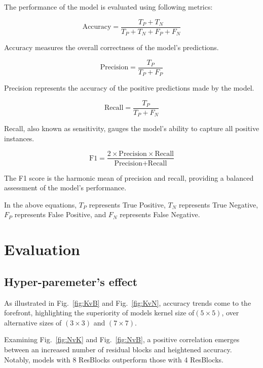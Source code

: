 The performance of the model is evaluated using following metrics:

\begin{equation}
	\text{Accuracy} = \frac{T_P + T_N}{T_P + T_N + F_P + F_N}
\end{equation}

Accuracy measures the overall correctness of the model's predictions.

\begin{equation}
	\text{Precision} = \frac{T_P}{T_P + F_P}
\end{equation}

Precision represents the accuracy of the positive predictions made by the model.

\begin{equation}
	\text{Recall} = \frac{T_P}{T_P + F_N}
\end{equation}

Recall, also known as sensitivity, gauges the model's ability to capture all positive instances.

\begin{equation}
	\text{F1} = \frac{2 \times \text{Precision} \times \text{Recall}}{\text{Precision} + \text{Recall}}
\end{equation}

The F1 score is the harmonic mean of precision and recall, providing a balanced assessment of the model's performance.

In the above equations, $T_P$ represents True Positive, $T_N$ represents True Negative, $F_P$ represents False Positive, and $F_N$ represents False Negative.


\section{Evaluation}


\subsection{Hyper-paremeter's effect}
As illustrated in Fig.~\ref{fig:KvB} and Fig.~\ref{fig:KvN}, accuracy trends come to the forefront, highlighting the superiority of models kernel size  of$ (5\times5)$, over alternative sizes of $(3\times3)$ and $(7\times7)$.

Examining Fig.~\ref{fig:NvK} and Fig.~\ref{fig:NvB}, a positive correlation emerges between an increased number of residual blocks and heightened accuracy. Notably, models with 8 ResBlocks outperform those with 4 ResBlocks.

